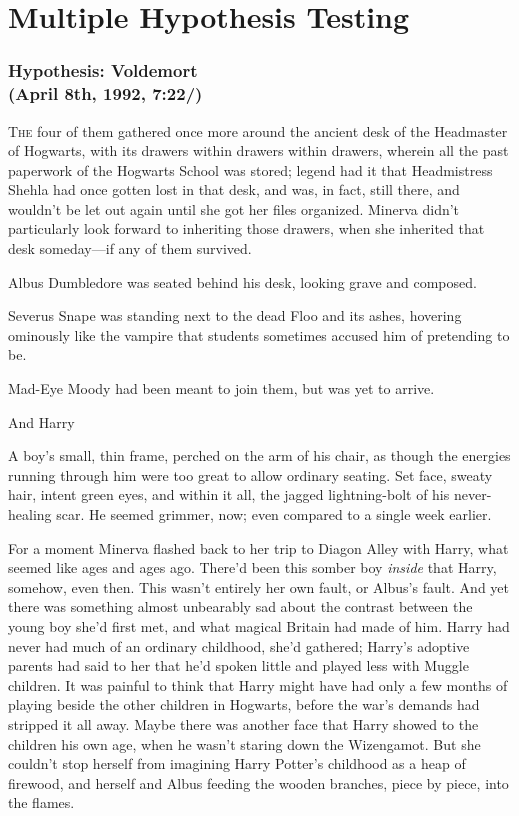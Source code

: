 \chapter{Multiple Hypothesis Testing}

\subsection{Hypothesis: Voldemort\\
(April 8th, 1992, 7:22\PM/)}

\lettrine{T}{he} four of them gathered once more around the ancient desk of the Headmaster
of Hogwarts, with its drawers within drawers within drawers, wherein all the
past paperwork of the Hogwarts School was stored; legend had it that
Headmistress Shehla had once gotten lost in that desk, and was, in fact, still
there, and wouldn't be let out again until she got her files organized. Minerva
didn't particularly look forward to inheriting those drawers, when she
inherited that desk someday---if any of them survived.

Albus Dumbledore was seated behind his desk, looking grave and composed.

Severus Snape was standing next to the dead Floo and its ashes, hovering
ominously like the vampire that students sometimes accused him of pretending to
be.

Mad-Eye Moody had been meant to join them, but was yet to arrive.

And Harry{\el}

A boy's small, thin frame, perched on the arm of his chair, as though the
energies running through him were too great to allow ordinary seating. Set
face, sweaty hair, intent green eyes, and within it all, the jagged
lightning-bolt of his never-healing scar. He seemed grimmer, now; even compared
to a single week earlier.

For a moment Minerva flashed back to her trip to Diagon Alley with Harry, what
seemed like ages and ages ago. There'd been this somber boy \emph{inside} that
Harry, somehow, even then. This wasn't entirely her own fault, or Albus's
fault. And yet there was something almost unbearably sad about the contrast
between the young boy she'd first met, and what magical Britain had made of
him. Harry had never had much of an ordinary childhood, she'd gathered; Harry's
adoptive parents had said to her that he'd spoken little and played less with
Muggle children. It was painful to think that Harry might have had only a few
months of playing beside the other children in Hogwarts, before the war's
demands had stripped it all away. Maybe there was another face that Harry
showed to the children his own age, when he wasn't staring down the Wizengamot.
But she couldn't stop herself from imagining Harry Potter's childhood as a heap
of firewood, and herself and Albus feeding the wooden branches, piece by piece,
into the flames.

